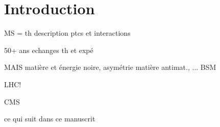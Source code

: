\chapter{Introduction}\label{chapter-introduction}

MS = th description ptcs et interactions

50+ ans echanges th et expé

MAIS matière et énergie noire, asymétrie matière antimat., ... BSM

LHC!

CMS

\og ce qui suit dans ce manuscrit \fg{} 
